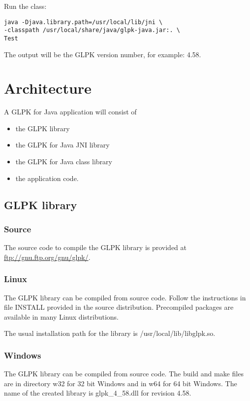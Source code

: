 \documentclass[a4paper,11pt]{report}
\newcommand{\glpkVersionMajor}{4}
\newcommand{\glpkVersionMinor}{58}
\begin{document}
Run the class:

\begin{lstlisting}
java -Djava.library.path=/usr/local/lib/jni \
-classpath /usr/local/share/java/glpk-java.jar:. \
Test
\end{lstlisting}

The output will be the GLPK version number, for example: \glpkVersionMajor.\glpkVersionMinor.

\chapter{Architecture}
A GLPK for Java application will consist of
\begin{itemize}
\item the GLPK library
\item the GLPK for Java JNI library
\item the GLPK for Java class library
\item the application code.
\end{itemize}

\section{GLPK library}

\subsection{Source}
The source code to compile the GLPK library is provided at \linebreak\href{ftp://gnu.ftp.org/gnu/glpk/}{ftp://gnu.ftp.org/gnu/glpk/}.

\subsection{Linux}
The GLPK library can be compiled from source code. Follow the instructions in file INSTALL provided in the source distribution. Precompiled packages are available in many Linux distributions.

The usual installation path for the library is /usr/local/lib/libglpk.so.
\subsection{Windows}
\index{Windows}
The GLPK library can be compiled from source code. The build and make files are in directory w32 for 32 bit Windows and in w64 for 64 bit Windows. The name of the created library is glpk\_\glpkVersionMajor\_\glpkVersionMinor.dll for revision \glpkVersionMajor.\glpkVersionMinor.
\end{document}
